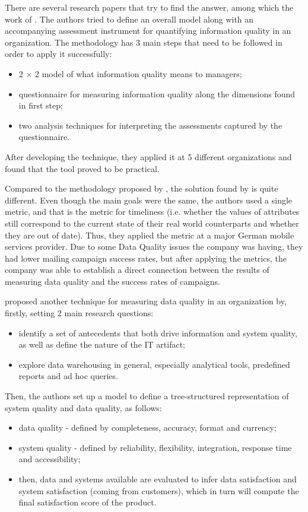 \documentclass{mprop}
\begin{document}
There are several research papers that try to find the answer, among which the 
work of \citet{lee2002aimq}. The authors tried to define an overall model along 
with an accompanying assessment instrument for quantifying information quality 
in an organization. The methodology has 3 main steps that need to be followed 
in order to apply it successfully:
  \begin{itemize}
    \item 2 $\times$ 2 model of what information quality means to managers;
    \item questionnaire for measuring information quality along the dimensions
    found in first step;
    \item two analysis techniques for interpreting the assessments captured 
    by the questionnaire.
  \end{itemize} 
After developing the technique, they applied it at 5 different organizations and
found that the tool proved to be practical.

Compared to the methodology proposed by \citet{lee2002aimq}, the solution found
by \citet{Heinrich2007MetricsDataQuality} is quite different. Even though the 
main goals were the same, the authors used a single metric, and that is 
the metric for timeliness (i.e. whether the values of attributes still 
correspond to the current state of their real world counterparts and whether 
they are out of date). Thus, they applied the metric at a major German mobile 
services provider. Due to some Data Quality issues the company was having, they 
had lower mailing campaign success rates, but after applying the metrics, the 
company was able to establish a direct connection between the results of
measuring data quality and the success rates of campaigns.

\citet{nelson2005antecedents} proposed another technique for measuring data 
quality in an organization by, firstly, setting 2 main research questions:
  \begin{itemize}
    \item identify a set of antecedents that both drive information and
      system quality, as well as define the nature of the IT artifact;
    \item explore data warehousing in general, especially analytical tools,
      predefined reports and ad hoc queries.
  \end{itemize}

Then, the authors set up a model to define a tree-structured representation
of system quality and data quality, as follows:
  \begin{itemize}
    \item data quality - defined by completeness, accuracy, format and currency;
    \item system quality - defined by reliability, flexibility, integration,
    response time and accessibility;
    \item then, data and systems available are evaluated to infer 
    data satisfaction and system satisfaction (coming from customers), which
    in turn will compute the final satisfaction score of the product.
  \end{itemize}
\end{document}

